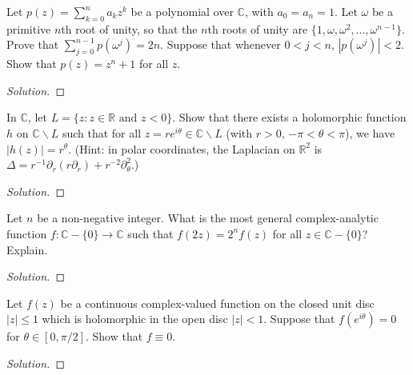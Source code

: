 \documentclass[10pt]{article}
\newenvironment{soln}{\begin{proof}[Solution]}{\end{proof}}
\begin{document}
\begin{problem}
[1998 A-I-6]
Let $p(z)=\sum_{k=0}^{n}a_kz^k$ be a polynomial over $\mathbb{C}$, with $a_0=a_n=1$. Let $\omega$ be a primitive $n$th root of unity, so that the $n$th roots of unity are $\{1,\omega,\omega^2,\ldots,\omega^{n-1}\}$. Prove that $\sum_{j=0}^{n-1}p(\omega^j)=2n$. Suppose that whenever $0< j< n$, $|p(\omega^j)|<2$. Show that $p(z)=z^n+1$ for all $z$.
\end{problem}

\begin{soln}

\end{soln}



\begin{problem}
[1998 A-II-2]
In $\mathbb{C}$, let $L=\{z:z\in\mathbb{R}\text{ and }z<0\}$.
Show that there exists a holomorphic function $h$ on $\mathbb{C}\backslash L$ such that for all $z=re^{i\theta}\in\mathbb{C}\backslash L$ (with $r>0$, $-\pi<\theta<\pi$), we have $|h(z)|=r^\theta$.
(Hint: in polar coordinates, the Laplacian on $\mathbb{R}^2$ is $\Delta=r^{-1}\partial_r(r\partial_r)+r^{-2}\partial_\theta^2$.)
\end{problem}

\begin{soln}

\end{soln}



\begin{problem}
[1997 J-I-3]
Let $n$ be a non-negative integer. What is the most general complex-analytic function $f:\mathbb{C}-\{0\}\rightarrow\mathbb{C}$ such that $f(2z)=2^n f(z)$ for all $z\in\mathbb{C}-\{0\}$? Explain.
\end{problem}

\begin{soln}

\end{soln}



\begin{problem}
[1997 J-II-1]
Let $f(z)$ be a continuous complex-valued function on the closed unit disc $|z|\leq 1$ which is holomorphic in the open disc $|z|<1$. Suppose that $f(e^{i\theta})=0$ for $\theta\in[0,\pi/2]$. Show that $f\equiv 0$.
\end{problem}

\begin{soln}

\end{soln}
\end{document}
